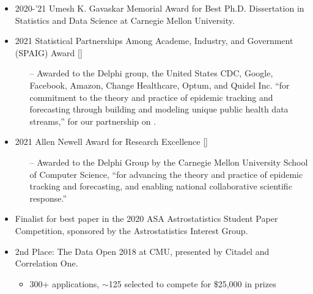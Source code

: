 \documentclass[letterpaper,10pt]{article}
\newcommand{\myhref}[3][blue]{\href{#2}{\color{#1}{#3}}}
\begin{document}
\begin{itemize}[leftmargin=0.6cm]
\item 2020-'21 Umesh K. Gavaskar Memorial Award for Best Ph.D. Dissertation in Statistics and Data Science at Carnegie Mellon University.

\vspace{0.075cm}
\item 2021 Statistical Partnerships Among Academe, Industry, and Government (SPAIG) Award [\myhref{https://magazine.amstat.org/blog/2021/10/01/2021-spaig-award/}{Link}]
\vspace{-0.1cm}
{\small
\begin{itemize}
\item[--] Awarded to the Delphi group, the United States CDC, Google, Facebook, Amazon, Change Healthcare, Optum, and Quidel Inc. ``for commitment to the theory and practice of epidemic tracking and forecasting through building and modeling unique public health data streams,'' for our partnership on \myhref{https://delphi.cmu.edu/covidcast/}{COVIDcast}.
\end{itemize}
}
\vspace{0.025cm}

\item 2021 Allen Newell Award for Research Excellence [\myhref{https://www.cs.cmu.edu/news/2021/delphi-research-group-collaborators-honored-covidcast}{Link}] 
\vspace{-0.1cm}
{\small
\begin{itemize}
\item[--] Awarded to the Delphi Group by the Carnegie Mellon University School of Computer Science, ``for advancing the theory and practice of epidemic tracking and forecasting, and enabling national collaborative scientific response.'' 
\end{itemize}
}

\vspace{-0.075cm}

\item Finalist for best paper in the 2020 ASA Astrostatistics Student Paper Competition, sponsored by the Astrostatistics Interest Group.

\vspace{0.05cm}

\item 2nd Place: The Data Open 2018 at CMU, presented by Citadel and Correlation One.
\begin{itemize}
\vspace{-0.15cm}
\item 300+ applications, $\sim$125 selected to compete for \$25,000 in prizes
\end{itemize}


\end{itemize}
\end{document}
